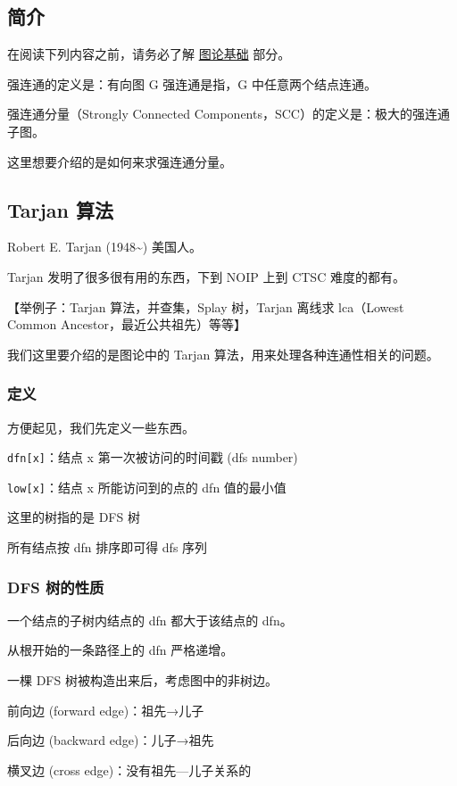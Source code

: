 
\subsection{简介}

在阅读下列内容之前，请务必了解 \href{/graph/basic}{图论基础} 部分。

强连通的定义是：有向图 G 强连通是指，G 中任意两个结点连通。

强连通分量（Strongly Connected Components，SCC）的定义是：极大的强连通子图。

这里想要介绍的是如何来求强连通分量。

\subsection{Tarjan 算法}

Robert E. Tarjan (1948\textasciitilde{}) 美国人。

Tarjan 发明了很多很有用的东西，下到 NOIP 上到 CTSC 难度的都有。

【举例子：Tarjan 算法，并查集，Splay 树，Tarjan 离线求 lca（Lowest Common Ancestor，最近公共祖先）等等】

我们这里要介绍的是图论中的 Tarjan 算法，用来处理各种连通性相关的问题。

\subsubsection{定义}

方便起见，我们先定义一些东西。

\texttt{dfn[x]}：结点 x 第一次被访问的时间戳 (dfs number)

\texttt{low[x]}：结点 x 所能访问到的点的 dfn 值的最小值

这里的树指的是 DFS 树

所有结点按 dfn 排序即可得 dfs 序列

\subsubsection{DFS 树的性质}

一个结点的子树内结点的 dfn 都大于该结点的 dfn。 

从根开始的一条路径上的 dfn 严格递增。

一棵 DFS 树被构造出来后，考虑图中的非树边。

前向边 (forward edge)：祖先→儿子

后向边 (backward edge)：儿子→祖先

横叉边 (cross edge)：没有祖先—儿子关系的


